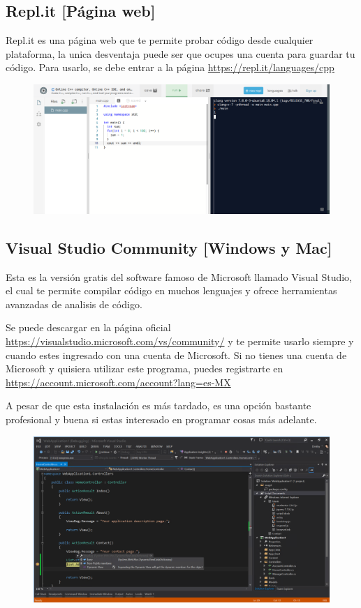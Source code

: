 \documentclass{article}
\begin{document}
\subsection{Repl.it [Página web]}
Repl.it es una página web que te permite probar código desde cualquier plataforma, la unica desventaja puede ser que ocupes una cuenta para guardar tu código. Para usarlo, se debe entrar a la página \url{https://repl.it/languages/cpp}

\begin{figure}[H]
    \centering
    \includegraphics[width=0.5\paperwidth]{replit}
\end{figure}

\subsection{Visual Studio Community [Windows y Mac]}
Esta es la versión gratis del software famoso de Microsoft llamado Visual Studio, el cual te permite compilar código en muchos lenguajes y ofrece herramientas avanzadas de analisis de código.

Se puede descargar en la página oficial \url{https://visualstudio.microsoft.com/vs/community/} y te permite usarlo siempre y cuando estes ingresado con una cuenta de Microsoft. Si no tienes una cuenta de Microsoft y quisiera utilizar este programa, puedes registrarte en \url{https://account.microsoft.com/account?lang=es-MX}

A pesar de que esta instalación es más tardado, es una opción bastante profesional y buena si estas interesado en programar cosas más adelante.

\begin{figure}[H]
    \centering
    \includegraphics[width=0.5\paperwidth]{vscommunity}
\end{figure}
\end{document}

